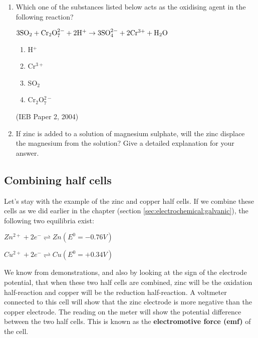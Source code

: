 {\begin{enumerate}
{	\begin{enumerate}
	\item{Which substance is the strongest oxidising agent?}
	\item{Which substance is the strongest reducing agent?}
	\end{enumerate}}

\item{Which one of the substances listed below acts as the oxidising agent in the following reaction?
\begin{center}
$\rm{3SO_{2} + Cr_{2}O_{7}^{2-} + 2H^{+} \rightarrow 3SO_{4}^{2-} + 2Cr^{3+} + H_{2}O}$
\end{center}
	\begin{enumerate}
	\item{H$^{+}$}
	\item{Cr$^{3+}$}
	\item{SO$_{2}$}
	\item{Cr$_{2}$O$_{7}^{2-}$}
	\end{enumerate}
(IEB Paper 2, 2004)
}
\item{If zinc is added to a solution of magnesium sulphate, will the zinc displace the magnesium from the solution? Give a detailed explanation for your answer.}
\end{enumerate}
} %


\subsection{Combining half cells}
\label{subsec:electrochemical:combining half cells}

Let's stay with the example of the zinc and copper half cells. If we combine these cells as we did earlier in the chapter (section \ref{sec:electrochemical:galvanic}), the following two equilibria exist:

\begin{center}
\rm${Zn^{2+} + 2e^{-} \rightleftharpoons Zn (E^{0} = -0.76V)}$

\rm${Cu^{2+} + 2e^{-} \rightleftharpoons Cu (E^{0} = +0.34V)}$
\end{center}

We know from demonstrations, and also by looking at the sign of the electrode potential, that when these two half cells are combined, zinc will be the oxidation half-reaction and copper will be the reduction half-reaction. A voltmeter connected to this cell will show that the zinc electrode is more negative than the copper electrode. The reading on the meter will show the potential difference between the two half cells. This is known as the \textbf{electromotive force (emf)} of the cell.

